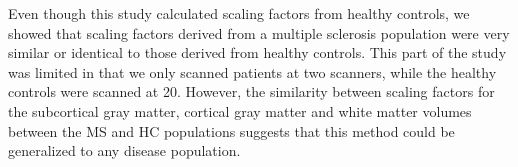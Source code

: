 Even though this study calculated scaling factors from healthy controls, we showed that scaling factors derived from a multiple sclerosis population were very similar or identical to those derived from healthy controls. This part of the study was limited in that we only scanned patients at two scanners, while the healthy controls were scanned at 20. However, the similarity between scaling factors for the subcortical gray matter, cortical gray matter and white matter volumes between the MS and HC populations suggests that this method could be generalized to any disease population.